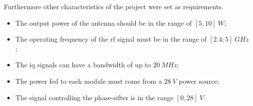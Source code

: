 \par Furthermore other characteristics of the project were set as requirements.

\begin{itemize}
    \item The output power of the antenna should be in the range of $[5, 10]\:\si{W}$;
    \item The operating frequency of the \ac{rf} signal must be in the range of $[2.4; 5] \:\si{GHz}$;
    \item The \ac{iq} signals can have a bandwidth of up to $20 \:\si{MHz}$;
    \item The power fed to each module must come from a $28 \:\si{V}$ power source;
    \item The signal controlling the phase-sifter is in the range $[0, 28] \:\si{V}$.
\end{itemize}
